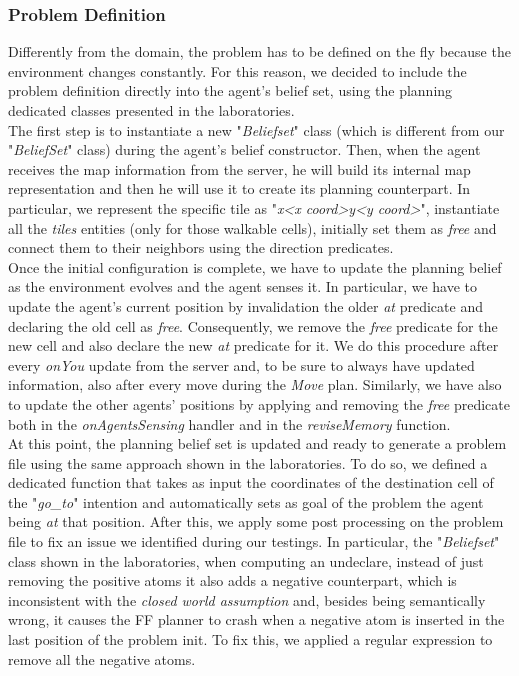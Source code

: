         \subsubsection{Problem Definition}
            Differently from the domain, the problem has to be defined on the fly because the environment changes constantly. For this reason, we decided to include the problem definition directly into the agent's belief set, using the planning dedicated classes presented in the laboratories.
            \medskip\\
            The first step is to instantiate a new "\textit{Beliefset}" class (which is different from our "\textit{BeliefSet}" class) during the agent's belief constructor. Then, when the agent receives the map information from the server, he will build its internal map representation and then he will use it to create its planning counterpart. In particular, we represent the specific tile as "\textit{x<x coord>y<y coord>}", instantiate all the \textit{tiles} entities (only for those walkable cells), initially set them as \textit{free} and connect them to their neighbors using the direction predicates.
            \medskip\\
            Once the initial configuration is complete, we have to update the planning belief as the environment evolves and the agent senses it. In particular, we have to update the agent's current position by invalidation the older \textit{at} predicate and declaring the old cell as \textit{free}. Consequently, we remove the \textit{free} predicate for the new cell and also declare the new \textit{at} predicate for it. We do this procedure after every \textit{onYou} update from the server and, to be sure to always have updated information, also after every move during the \textit{Move} plan. Similarly, we have also to update the other agents' positions by applying and removing the \textit{free} predicate both in the \textit{onAgentsSensing} handler and in the \textit{reviseMemory} function.
            \medskip\\
            At this point, the planning belief set is updated and ready to generate a problem file using the same approach shown in the laboratories. To do so, we defined a dedicated function that takes as input the coordinates of the destination cell of the "\textit{go\_to}" intention and automatically sets as goal of the problem the agent being \textit{at} that position. After this, we apply some post processing on the problem file to fix an issue we identified during our testings. In particular, the "\textit{Beliefset}" class shown in the laboratories, when computing an undeclare, instead of just removing the positive atoms it also adds a negative counterpart, which is inconsistent with the \textit{closed world assumption} and, besides being semantically wrong, it causes the FF planner to crash when a negative atom is inserted in the last position of the problem init. To fix this, we applied a regular expression to remove all the negative atoms.


